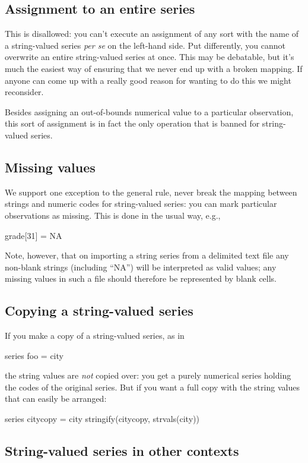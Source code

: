 \subsection{Assignment to an entire series}

This is disallowed: you can't execute an assignment of any sort with
the name of a string-valued series \textit{per se} on the left-hand
side. Put differently, you cannot overwrite an entire string-valued
series at once. This may be debatable, but it's much the easiest way
of ensuring that we never end up with a broken mapping. If anyone can
come up with a really good reason for wanting to do this we might
reconsider.

Besides assigning an out-of-bounds numerical value to a particular
observation, this sort of assignment is in fact the only operation
that is banned for string-valued series.

\subsection{Missing values}

We support one exception to the general rule, never break the mapping
between strings and numeric codes for string-valued series: you can
mark particular observations as missing. This is done in the usual
way, e.g.,
\begin{code}
grade[31] = NA
\end{code}
Note, however, that on importing a string series from a delimited text
file any non-blank strings (including ``NA'') will be interpreted as
valid values; any missing values in such a file should therefore be
represented by blank cells.

\subsection{Copying a string-valued series}

If you make a copy of a string-valued series, as in
\begin{code}
series foo = city
\end{code}
the string values are \textit{not} copied over: you get a purely
numerical series holding the codes of the original series. But if you
want a full copy with the string values that can easily be arranged:
\begin{code}
series citycopy = city
stringify(citycopy, strvals(city))
\end{code}

\subsection{String-valued series in other contexts}


